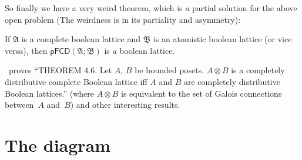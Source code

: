So finally we have a very weird theorem, which is a partial solution for the
above open problem (The weirdness is in its partiality and asymmetry):

\begin{thm}
  If $\mathfrak{A}$ is a complete boolean lattice and $\mathfrak{B}$ is an
  atomistic boolean lattice (or vice versa), then $\mathsf{pFCD} (\mathfrak{A};
  \mathfrak{B})$ is a boolean lattice.
\end{thm}

\cite{shmuely1974}~proves
``THEOREM 4.6. Let $A$, $B$ be bounded posets. $A \otimes B$ is a completely
distributive complete Boolean lattice iff $A$ and $B$ are completely distributive
Boolean lattices.'' (where $A \otimes B$ is equivalent to the set of Galois connections between~$A$ and~$B$) and other interesting results.

\section{The diagram}

